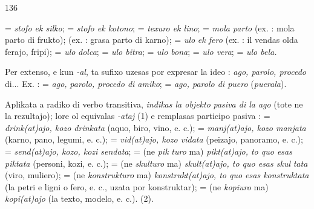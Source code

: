 \begin{VUpage}[140]{136}

\VUcontinue
= \textit{stofo ek silko};  = \textit{stofo ek kotono};  =\nl
\textit{texuro ek lino};  = \textit{mola parto} (ex. : mola parto di\nl
frukto);  (ex. : grasa parto di karno);  = \textit{ulo}\nl
\textit{ek fero} (ex. : il vendas olda ferajo, fripi);  = \textit{ulo}\nl
\textit{dolca};  = \textit{ulo bitra};  = \textit{ulo bona};  =\nl
\textit{ulo vera};  = \textit{ulo bela.}

Per extenso, e kun \textit{-al}, ta sufixo uzesas por expresar la\nl
ideo : \textit{ago, parolo, procedo} di... Ex. :  = \textit{ago,}\nl
\textit{parolo, procedo di amiko};  = \textit{ago, parolo di puero}\nl
(\textit{puerala}).

Aplikata a radiko di verbo transitiva,  \textit{indikas la objekto}\nl
\textit{pasiva di la ago} (tote ne la rezultajo); lore ol equivalas\nl
\textit{-ataj} (1) e remplasas participo pasiva :  =\nl
\textit{drink(at)ajo, kozo drinkata} (aquo, biro, vino, e. c.); \nl
= \textit{manj(at)ajo, kozo manjata} (karno, pano, legumi, e. c.);\nl
{} = \textit{vid(at)ajo, kozo vidata} (peizajo, panoramo, e. c.);\nl
{} = \textit{send(at)ajo, kozo, kozi sendata};  = (ne \textit{pik}\cc
\textit{turo} ma) \textit{pikt(at)ajo, to quo esas piktata} (personi, kozi, e. c.);\nl
{} = (ne \textit{skulturo} ma) \textit{skult(at)ajo, to quo esas skul}\cc
\textit{tata} (viro, muliero);  = (ne \textit{konstrukturo} ma)\nl
\textit{konstrukt(at)ajo, to quo esas konstruktata} (la petri e ligni o\nl
fero, e. c., uzata por konstruktar);  = (ne \textit{kopiuro} ma)\nl
\textit{kopi(at)ajo} (la texto, modelo, e. c.). \nl
{} (2).


\end{VUpage}
